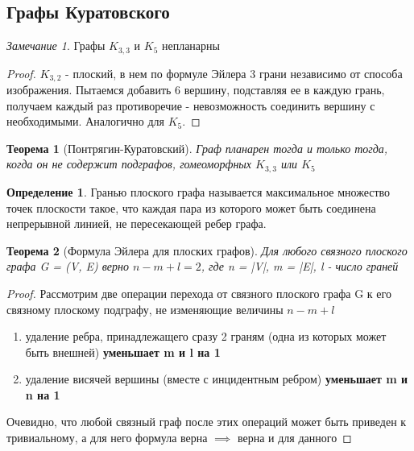 \documentclass[a4paper]{article}
\newtheorem{theorem}{Теорема}[section]
\theoremstyle{definition}
\newtheorem*{definition}{Определение}
\theoremstyle{remark}
\newtheorem*{remark}{Замечание}
\begin{document}
\begin{multicols*}{2}
    \subsection*{Графы Куратовского}
    \begin{remark}
        Графы $K_{3,3}$ и $K_5$ непланарны
    \end{remark}
    \begin{proof}
        $K_{3, 2}$ - плоский, в нем по формуле Эйлера 3 грани независимо от способа изображения.
        Пытаемся добавить 6 вершину, подставляя ее в каждую грань, получаем каждый раз противоречие - 
        невозможность соединить вершину с необходимыми.
        Аналогично для $K_5$.
    \end{proof}
    \begin{theorem}[Понтрягин-Куратовский]
        Граф планарен тогда и только тогда, когда он не содержит подграфов, гомеоморфных $K_{3,3}$ или $K_5$
    \end{theorem}
    \begin{definition}
        Гранью плоского графа называется максимальное множество точек плоскости такое, что каждая пара из которого может быть соединена непрерывной линией, не пересекающей ребер графа.
    \end{definition}
    \begin{theorem}[Формула Эйлера для плоских графов]
        Для любого связного плоского графа G = (V, E) верно $n - m + l = 2$, где n = |V|, m = |E|,
        l - число граней 
    \end{theorem}
    \begin{proof}
        Рассмотрим две операции перехода от связного плоского графа G к его связному 
        плоскому подграфу, не изменяющие величины $n - m + l$
        \begin{enumerate}
            \item удаление ребра, принадлежащего сразу 2 граням (одна из которых может быть внешней) \textbf{уменьшает m и l на 1}
            \item удаление висячей вершины (вместе с инцидентным ребром) \textbf{уменьшает m и n на 1}
        \end{enumerate}
        Очевидно, что любой связный граф после этих операций может быть приведен к тривиальному, а для него формула верна $\implies$
        верна и для данного 
    \end{proof}

\end{multicols*}
\end{document}

